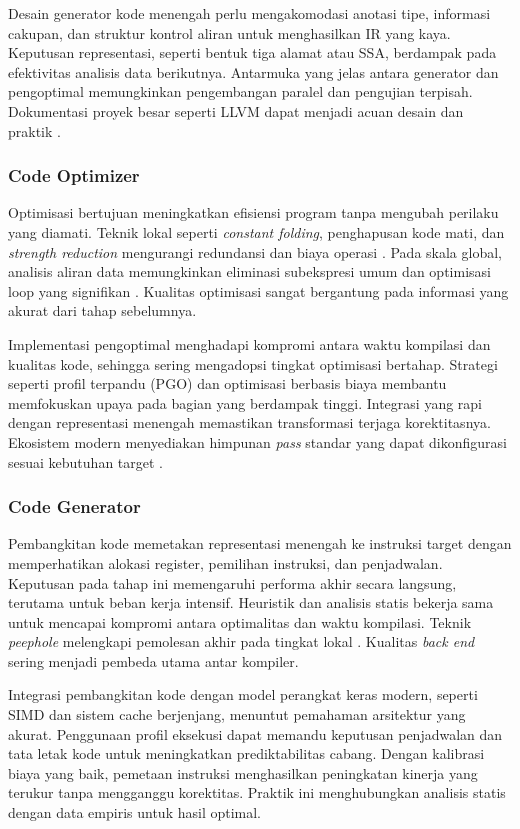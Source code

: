 \documentclass[../main.tex]{subfiles}
\begin{document}
Desain generator kode menengah perlu mengakomodasi anotasi tipe, informasi cakupan, dan struktur kontrol aliran untuk menghasilkan IR yang kaya. Keputusan representasi, seperti bentuk tiga alamat atau SSA, berdampak pada efektivitas analisis data berikutnya. Antarmuka yang jelas antara generator dan pengoptimal memungkinkan pengembangan paralel dan pengujian terpisah. Dokumentasi proyek besar seperti LLVM dapat menjadi acuan desain dan praktik \citep{LLVMOverview}.

\subsubsection{Code Optimizer}
Optimisasi bertujuan meningkatkan efisiensi program tanpa mengubah perilaku yang diamati. Teknik lokal seperti \emph{constant folding}, penghapusan kode mati, dan \emph{strength reduction} mengurangi redundansi dan biaya operasi \citep{WikiConstantFolding,WikiDCE,WikiStrengthReduction}. Pada skala global, analisis aliran data memungkinkan eliminasi subekspresi umum dan optimisasi loop yang signifikan \citep{WikiCSE,WikiLoopOptimization}. Kualitas optimisasi sangat bergantung pada informasi yang akurat dari tahap sebelumnya.

Implementasi pengoptimal menghadapi kompromi antara waktu kompilasi dan kualitas kode, sehingga sering mengadopsi tingkat optimisasi bertahap. Strategi seperti profil terpandu (PGO) dan optimisasi berbasis biaya membantu memfokuskan upaya pada bagian yang berdampak tinggi. Integrasi yang rapi dengan representasi menengah memastikan transformasi terjaga korektitasnya. Ekosistem modern menyediakan himpunan \emph{pass} standar yang dapat dikonfigurasi sesuai kebutuhan target \citep{LLVMOverview,WikiOptimization}.

\subsubsection{Code Generator}
Pembangkitan kode memetakan representasi menengah ke instruksi target dengan memperhatikan alokasi register, pemilihan instruksi, dan penjadwalan. Keputusan pada tahap ini memengaruhi performa akhir secara langsung, terutama untuk beban kerja intensif. Heuristik dan analisis statis bekerja sama untuk mencapai kompromi antara optimalitas dan waktu kompilasi. Teknik \emph{peephole} melengkapi pemolesan akhir pada tingkat lokal \citep{WikiPeephole}. Kualitas \emph{back end} sering menjadi pembeda utama antar kompiler.

Integrasi pembangkitan kode dengan model perangkat keras modern, seperti SIMD dan sistem cache berjenjang, menuntut pemahaman arsitektur yang akurat. Penggunaan profil eksekusi dapat memandu keputusan penjadwalan dan tata letak kode untuk meningkatkan prediktabilitas cabang. Dengan kalibrasi biaya yang baik, pemetaan instruksi menghasilkan peningkatan kinerja yang terukur tanpa mengganggu korektitas. Praktik ini menghubungkan analisis statis dengan data empiris untuk hasil optimal.
\end{document}
